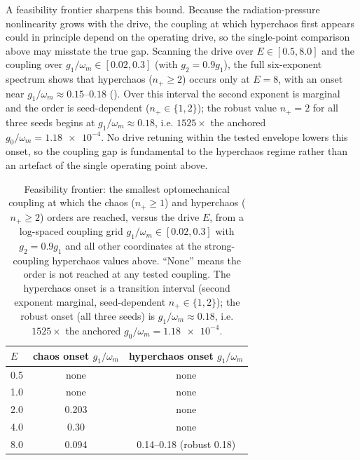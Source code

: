 \documentclass[Phys]{SciPost}
\begin{document}
A feasibility frontier sharpens this bound. Because the radiation-pressure
nonlinearity grows with the drive, the coupling at which hyperchaos first
appears could in principle depend on the operating drive, so the single-point
comparison above may misstate the true gap. Scanning the drive over
$E\in[\num{0.5},\num{8.0}]$ and the coupling over
$g_1/\omega_m\in[\num{0.02},\num{0.3}]$ (with $g_2=\num{0.9}g_1$), the full
six-exponent spectrum shows that hyperchaos ($n_+\ge2$) occurs only at
$E=\num{8}$, with an onset near $g_1/\omega_m\approx\num{0.15}$--$\num{0.18}$
(). Over this interval the second exponent
is marginal and the order is seed-dependent ($n_+\in\{1,2\}$); the robust
value $n_+=2$ for all three seeds begins at $g_1/\omega_m\approx\num{0.18}$,
i.e. $\num{1525}\times$ the anchored $g_0/\omega_m=\num{1.18e-4}$. No drive
retuning within the tested envelope lowers this onset, so the coupling gap is
fundamental to the hyperchaos regime rather than an artefact of the single
operating point above.

\begin{table}[h]
  \centering
  \caption{Feasibility frontier: the smallest optomechanical coupling at which
  the chaos ($n_+\ge1$) and hyperchaos ($n_+\ge2$) orders are reached, versus
  the drive $E$, from a log-spaced coupling grid
  $g_1/\omega_m\in[\num{0.02},\num{0.3}]$ with $g_2=\num{0.9}g_1$ and all other
  coordinates at the strong-coupling hyperchaos values above. ``None'' means the order is
  not reached at any tested coupling. The hyperchaos onset is a transition
  interval (second exponent marginal, seed-dependent $n_+\in\{1,2\}$); the
  robust onset (all three seeds) is $g_1/\omega_m\approx\num{0.18}$, i.e.
  $\num{1525}\times$ the anchored $g_0/\omega_m=\num{1.18e-4}$.}
  \label{SI-tab:si-feasibility-frontier}
  \begin{tabular}{@{}lcc@{}}
    \toprule
    $E$ & chaos onset $g_1/\omega_m$ & hyperchaos onset $g_1/\omega_m$ \\
    \midrule
    \num{0.5} & none & none \\
    \num{1.0} & none & none \\
    \num{2.0} & \num{0.203} & none \\
    \num{4.0} & \num{0.30} & none \\
    \num{8.0} & \num{0.094} & \num{0.14}--\num{0.18} (robust \num{0.18}) \\
    \bottomrule
  \end{tabular}
\end{table}
\end{document}
